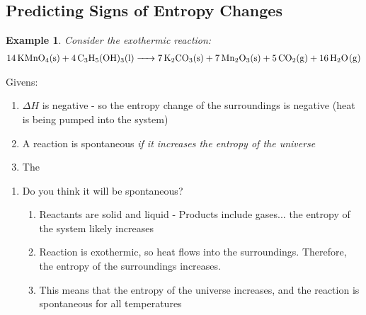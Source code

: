 \documentclass{article}  %
\newtheorem{exmp}{Example}
\begin{document}
\subsection*{Predicting Signs of Entropy Changes}
\begin{exmp}
    Consider the exothermic reaction:
    \begin{equation*}
        \begin{aligned}
            \ce{14KMnO4_(s) + 4C3H5(OH)3_(l) -> 7 K2CO3_(s) + 7 Mn2O3_(s) + 5 CO2_(g) + 16 H2O_(g)}
        \end{aligned}
    \end{equation*}
\end{exmp}
Givens:
\begin{enumerate}
    \item $\Delta H$ is negative - so the entropy change of the surroundings is negative (heat is being pumped into the system)
    \item A reaction is spontaneous \emph{if it increases the entropy of the universe}
    \item The 
\end{enumerate}
\begin{enumerate}
    \item Do you think it will be spontaneous? \\
        \begin{enumerate}
            \item Reactants are solid and liquid - Products include gases... the entropy of the system likely increases
            \item Reaction is exothermic, so heat flows into the surroundings. Therefore, the entropy of the surroundings increases.
            \item This means that the entropy of the universe increases, and the reaction is spontaneous for all temperatures
        \end{enumerate}
\end{enumerate}
\end{document}
